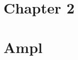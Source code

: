 \providecommand{\main}{.}








{\hypersetup{hidelinks}
  \tableofcontents  %
}

\chapter{Chapter 2}


\chapter{Ampl}



\appendix
%



